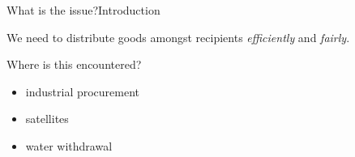 \begin{frame}{What is the issue?}{Introduction}
	\adjustfortopblock
	\begin{block}{}
		We need to distribute goods amongst recipients \emph{efficiently} and \emph{fairly}.
	\end{block}

	Where is this encountered?
	\begin{itemize}
		\item
		industrial procurement

		\item
		satellites

		\item
		water withdrawal
	\end{itemize}

	\smallskip

	\begin{center}
		\resizebox{!}{3cm}{}
		\hfil
		\resizebox{!}{3cm}{}
		\hfil
		\resizebox{!}{3cm}{}
	\end{center}
\end{frame}